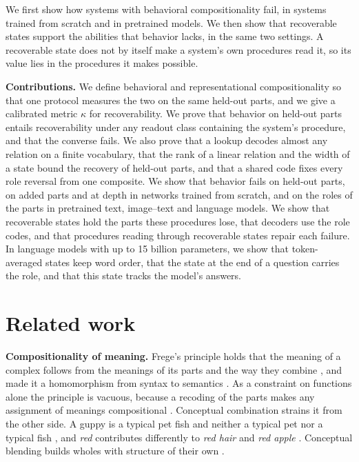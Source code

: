 \documentclass[10pt]{article}
\theoremstyle{plain}
\theoremstyle{remark}
\begin{document}
We first show how systems with behavioral compositionality fail, in systems trained from scratch and in pretrained models. We then show that recoverable states support the abilities that behavior lacks, in the same two settings. A recoverable state does not by itself make a system's own procedures read it, so its value lies in the procedures it makes possible.

\textbf{Contributions.} We define behavioral and representational compositionality so that one protocol measures the two on the same held-out parts, and we give a calibrated metric $\kappa$ for recoverability. We prove that behavior on held-out parts entails recoverability under any readout class containing the system's procedure, and that the converse fails. We also prove that a lookup decodes almost any relation on a finite vocabulary, that the rank of a linear relation and the width of a state bound the recovery of held-out parts, and that a shared code fixes every role reversal from one composite. We show that behavior fails on held-out parts, on added parts and at depth in networks trained from scratch, and on the roles of the parts in pretrained text, image--text and language models. We show that recoverable states hold the parts these procedures lose, that decoders use the role codes, and that procedures reading through recoverable states repair each failure. In language models with up to 15 billion parameters, we show that token-averaged states keep word order, that the state at the end of a question carries the role, and that this state tracks the model's answers.

\section{Related work}
\label{sec:related}

\textbf{Compositionality of meaning.} Frege's principle holds that the meaning of a complex follows from the meanings of its parts and the way they combine \citep{frege1923}, and \citet{montague1970} made it a homomorphism from syntax to semantics \citep[see][]{janssen1997}. As a constraint on functions alone the principle is vacuous, because a recoding of the parts makes any assignment of meanings compositional \citep{zadrozny1994}. Conceptual combination strains it from the other side. A guppy is a typical pet fish and neither a typical pet nor a typical fish \citep{osherson1981}, and \emph{red} contributes differently to \emph{red hair} and \emph{red apple} \citep{kamp1995}. Conceptual blending builds wholes with structure of their own \citep{fauconnier2002}.
\end{document}
